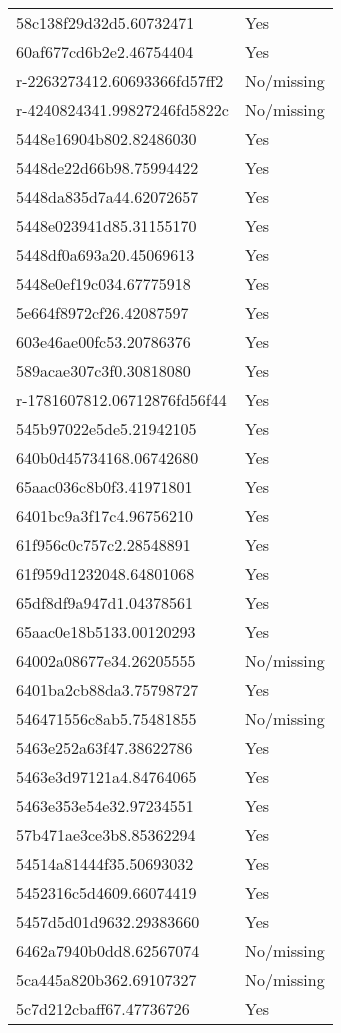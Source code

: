 \begin{tabular}{ll}
58c138f29d32d5.60732471 & Yes \\
60af677cd6b2e2.46754404 & Yes \\
r-2263273412.60693366fd57ff2 & No/missing \\
r-4240824341.99827246fd5822c & No/missing \\
5448e16904b802.82486030 & Yes \\
5448de22d66b98.75994422 & Yes \\
5448da835d7a44.62072657 & Yes \\
5448e023941d85.31155170 & Yes \\
5448df0a693a20.45069613 & Yes \\
5448e0ef19c034.67775918 & Yes \\
5e664f8972cf26.42087597 & Yes \\
603e46ae00fc53.20786376 & Yes \\
589acae307c3f0.30818080 & Yes \\
r-1781607812.06712876fd56f44 & Yes \\
545b97022e5de5.21942105 & Yes \\
640b0d45734168.06742680 & Yes \\
65aac036c8b0f3.41971801 & Yes \\
6401bc9a3f17c4.96756210 & Yes \\
61f956c0c757c2.28548891 & Yes \\
61f959d1232048.64801068 & Yes \\
65df8df9a947d1.04378561 & Yes \\
65aac0e18b5133.00120293 & Yes \\
64002a08677e34.26205555 & No/missing \\
6401ba2cb88da3.75798727 & Yes \\
546471556c8ab5.75481855 & No/missing \\
5463e252a63f47.38622786 & Yes \\
5463e3d97121a4.84764065 & Yes \\
5463e353e54e32.97234551 & Yes \\
57b471ae3ce3b8.85362294 & Yes \\
54514a81444f35.50693032 & Yes \\
5452316c5d4609.66074419 & Yes \\
5457d5d01d9632.29383660 & Yes \\
6462a7940b0dd8.62567074 & No/missing \\
5ca445a820b362.69107327 & No/missing \\
5c7d212cbaff67.47736726 & Yes \\

\end{tabular}
